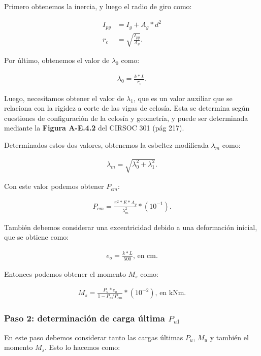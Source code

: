 \documentclass[../main.tex]{subfiles}
\begin{document}
Primero obtenemos la inercia, y luego el radio de giro como:

\begin{align*}
  I_{py} &= I_g + A_g * d^2 \\[5pt]
  r_c &=  \sqrt{\frac{I_{py}}{A_g}} 
.\end{align*}

Por último, obtenemos el valor de $\lambda_0$ como:

\begin{align*}
  \lambda_0 = \frac{k*L}{r_c}
.\end{align*}

Luego, necesitamos obtener el valor de $\lambda_1$, que es un valor auxiliar que
se relaciona con la rigidez a corte de las vigas de celosía. Esta se determina
según cuestiones de configuración de la celosía y geometría, y puede ser
determinada mediante la \textbf{Figura A-E.4.2} del CIRSOC 301 (pág 217).

Determinados estos dos valores, obtenemos la esbeltez modificada $\lambda_m$
como:

\begin{align*}
  \lambda_m = \sqrt{\lambda_0^2 + \lambda_1^2} 
.\end{align*}

Con este valor podemos obtener $P_{cm}$:

\begin{align*}
  P_{cm} = \frac{\pi^2 * E * A_g}{\lambda_m^2} *(10^{-1})
.\end{align*}

También debemos considerar una excentricidad debido a una deformación inicial,
que se obtiene como:

\begin{align*}
  e_o = \frac{k*L}{500} \text{, en cm}
.\end{align*}

Entonces podemos obtener el momento $M_s$ como:

 \begin{align*}
   M_s = \frac{P_u*e_o}{1-P_u /P_{cm}} * (10^{-2})\text{, en kNm}
.\end{align*}

\subsubsection{Paso 2: determinación de carga última $P_{u1}$}

En este paso debemos considerar tanto las cargas últimas $P_u$,  $M_u$ y  también
el momento $M_s$. Esto lo hacemos como:
\end{document}
